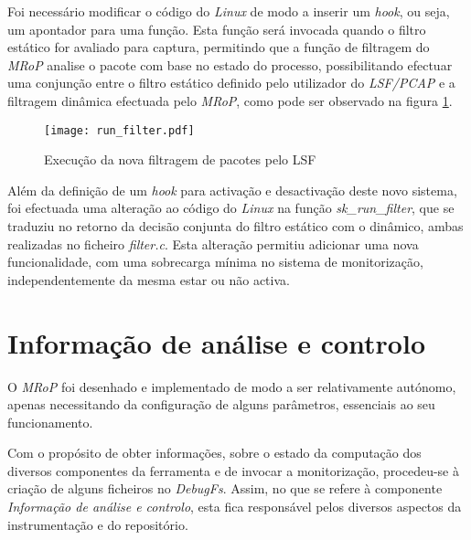 Foi necessário modificar o código do \textit{Linux} de modo a inserir um \textit{hook}, ou seja, um apontador para uma função.
Esta função será invocada quando o filtro estático for avaliado para captura, permitindo que a função de filtragem do \textit{MRoP} analise o pacote com base no estado do processo, possibilitando efectuar uma conjunção entre o filtro estático definido pelo utilizador do \textit{LSF/PCAP} e a filtragem dinâmica efectuada pelo \textit{MRoP}, como pode ser observado na figura \ref{fig:run_filter}.

\begin{figure}[!ht]
\centering
\texttt{[image: run\_filter.pdf]}
\caption{Execução da nova filtragem de pacotes pelo LSF}
\label{fig:run_filter}
\end{figure}

Além da definição de um \textit{hook} para activação e desactivação deste novo sistema, foi efectuada uma alteração ao código do \textit{Linux} na função \textit{sk\_run\_filter}, que se traduziu no retorno da decisão conjunta do filtro estático com o dinâmico, ambas realizadas no ficheiro \textit{filter.c}.
Esta alteração permitiu adicionar uma nova funcionalidade, com uma sobrecarga mínima no sistema de monitorização, independentemente da mesma estar ou não activa.



\section{Informação de análise e controlo}

O \textit{MRoP} foi desenhado e implementado de modo a ser relativamente autónomo, apenas necessitando da configuração de alguns parâmetros, essenciais ao seu funcionamento.

Com o propósito de obter informações, sobre o estado da computação dos diversos componentes da ferramenta e de invocar a monitorização, procedeu-se à criação de alguns ficheiros no \textit{DebugFs}.
Assim, no que se refere à componente \textit{Informação de análise e controlo}, esta fica responsável pelos diversos aspectos da instrumentação e do repositório.

